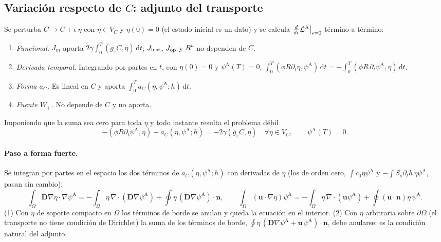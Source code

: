 \documentclass[11pt]{article}
\numberwithin{equation}{section}
\theoremstyle{plain}
\theoremstyle{definition}
\theoremstyle{remark}
\newcommand{\bu}{\mathbf{u}}
\newcommand{\bD}{\mathbf{D}}
\newcommand{\bn}{\mathbf{n}}
\newcommand{\Ceps}{g_\varepsilon}              %
\newcommand{\pA}{\psi^{\mathrm A}}          %
\newcommand{\dd}{\,\mathrm d}
\begin{document}
\subsection{Variación respecto de $C$: adjunto del transporte}
Se perturba $C\to C+\epsilon\,\eta$ con $\eta\in V_C$ y $\eta(0)=0$ (el estado inicial es un dato) y se calcula
$\frac{d}{d\epsilon}\mathcal{L}^{\rm A}\big|_{\epsilon=0}$ término a término:
\begin{enumerate}[label=\textbf{(\alph*)},nosep]
\item \emph{Funcional.} $J_m$ aporta $2\gamma\int_0^T(\Ceps C,\eta)\dd t$; $J_{\rm inst}$, $J_{\rm op}$ y $R^h$ no dependen de $C$.
\item \emph{Derivada temporal.} Integrando por partes en $t$, con $\eta(0)=0$ y $\pA(T)=0$,
  $\int_0^T(\phi R\partial_t\eta,\pA)\dd t=-\int_0^T(\phi R\,\partial_t\pA,\eta)\dd t$.
\item \emph{Forma $a_C$.} Es lineal en $C$ y aporta $\int_0^Ta_C(\eta,\pA;h)\dd t$.
\item \emph{Fuente $W_+$.} No depende de $C$ y no aporta.
\end{enumerate}
Imponiendo que la suma sea cero para toda $\eta$ y todo instante resulta el problema débil
\begin{equation}
-(\phi R\partial_t\pA,\eta)+a_C(\eta,\pA;h)=-2\gamma(\Ceps C,\eta)\quad\forall\eta\in V_C,
\qquad\pA(T)=0 .
\label{eq:adj_debil}
\end{equation}

\paragraph{Paso a forma fuerte.} Se integran por partes en el espacio los dos términos de $a_C(\eta,\pA;h)$ con
derivadas de $\eta$ (los de orden cero, $\int c_0\eta\pA$ y $-\int S_s\partial_th\,\eta\pA$, pasan sin cambio):
\[
\int_\Omega\bD\nabla\eta\cdot\nabla\pA=-\!\int_\Omega\eta\,\nabla\!\cdot(\bD\nabla\pA)+\oint\eta\,(\bD\nabla\pA)\cdot\bn,
\qquad
\int_\Omega(\bu\cdot\nabla\eta)\pA=-\!\int_\Omega\eta\,\nabla\!\cdot(\bu\pA)+\oint(\bu\cdot\bn)\eta\,\pA .
\]
(1) Con $\eta$ de soporte compacto en $\Omega$ los términos de borde se anulan y queda la ecuación en el interior.
(2) Con $\eta$ arbitraria sobre $\partial\Omega$ (el transporte no tiene condición de Dirichlet) la suma de los términos de borde,
$\oint\eta\,(\bD\nabla\pA+\bu\,\pA)\cdot\bn$, debe anularse: es la condición natural del adjunto.
\end{document}
